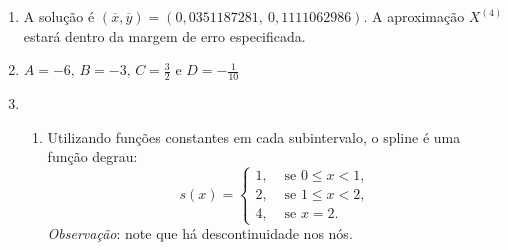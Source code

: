 \documentclass[12pt,a4paper]{article}
\begin{document}
\begin{enumerate}
\item A solução é $(\overline{x},\overline{y}) = (0,0351187281,\ 0,1111062986)$. A aproximação $X^{(4)}$ estará dentro da margem de erro especificada.
\item $A = -6$, $B = -3$, $C = \frac{3}{2}$ e $D = -\frac{1}{10}$
\item
\begin{enumerate}
\item Utilizando funções constantes em cada subintervalo, o spline é uma função degrau:
\[
s(x) =
\begin{cases}
1, & \text{ se } 0\leq x < 1, \\
2, & \text{ se } 1\leq x < 2, \\
4, & \text{ se } x = 2.
\end{cases}
\]
\textit{Observação}: note que há descontinuidade nos nós.


\end{enumerate}
\end{enumerate}
\end{document}
